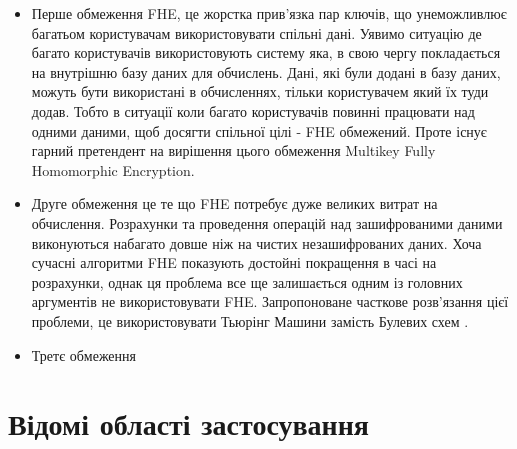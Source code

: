 \begin{itemize}
    \item Перше обмеження FHE, це жорстка прив'язка пар ключів, що унеможливлює багатьом користувачам використовувати спільні дані. Уявимо ситуацію де багато
користувачів використовують систему яка, в свою чергу покладається на внутрішню базу 
даних для обчислень. Дані, які були додані в базу даних, можуть бути використані в
обчисленнях, тільки користувачем який їх туди додав. Тобто в ситуації коли багато 
користувачів повинні працювати над одними даними, щоб досягти спільної цілі - FHE 
обмежений. Проте існує гарний претендент на вирішення цього обмеження \cite{cryptoeprint:2013/094} Multikey Fully Homomorphic Encryption.

    \item Друге обмеження це те що FHE потребує дуже великих витрат на обчислення.
Розрахунки та проведення операцій над зашифрованими даними виконуються набагато довше ніж
на чистих незашифрованих даних. Хоча сучасні алгоритми FHE показують достойні 
покращення в часі на розрахунки, однак ця проблема все ще залишається одним із головних
аргументів не використовувати FHE. Запропоноване часткове розв'язання цієї проблеми, це 
використовувати Тьюрінг Машини замість Булевих схем \cite{10.1007/978-3-642-40084-1_30}.

    \item Третє обмеження 

\end{itemize}

\section{Відомі області застосування}
